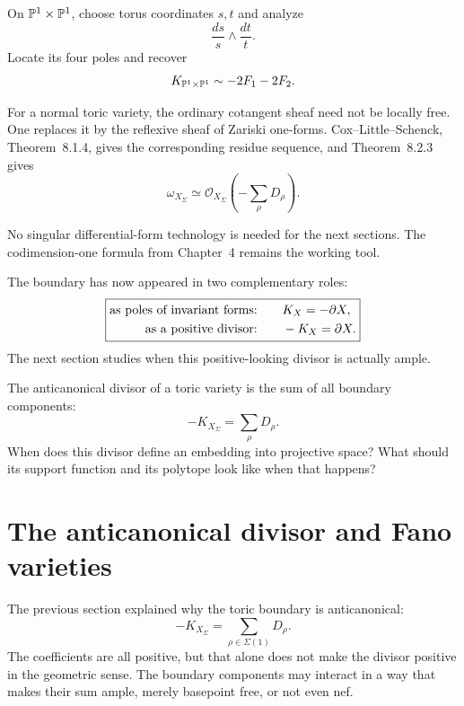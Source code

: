 \begin{pauseandthink}
On \(\mathbb{P}^1\times\mathbb{P}^1\), choose torus coordinates \(s,t\) and analyze
\[
\frac{ds}{s}\wedge\frac{dt}{t}.
\]
Locate its four poles and recover
\[
K_{\mathbb{P}^1\times\mathbb{P}^1}
\sim
-2F_1-2F_2.
\]
\end{pauseandthink}

\begin{observation}
For a normal toric variety, the ordinary cotangent sheaf need not be
locally free. One replaces it by the reflexive sheaf of Zariski
one-forms. Cox--Little--Schenck, Theorem~8.1.4, gives the corresponding
residue sequence, and Theorem~8.2.3 gives
\[
\omega_{X_\Sigma}
\simeq
\mathcal O_{X_\Sigma}\!\left(-\sum_\rho D_\rho\right).
\]

No singular differential-form technology is needed for the next
sections. The codimension-one formula from Chapter~4 remains the
working tool.
\end{observation}

The boundary has now appeared in two complementary roles:
\[
\boxed{
\begin{aligned}
\text{as poles of invariant forms:}
&\qquad K_X=-\partial X,\\
\text{as a positive divisor:}
&\qquad -K_X=\partial X.
\end{aligned}
}
\]
The next section studies when this positive-looking divisor is
actually ample.

\begin{guidingquestion}
The anticanonical divisor of a toric variety is the sum of all boundary
components:
\[
-K_{X_\Sigma}=\sum_\rho D_\rho.
\]
When does this divisor define an embedding into projective space?
What should its support function and its polytope look like when that
happens?
\end{guidingquestion}
\section{The anticanonical divisor and Fano varieties}
\label{sec:anticanonical-fano}

The previous section explained why the toric boundary is anticanonical:
\[
-K_{X_\Sigma}=\sum_{\rho\in\Sigma(1)}D_\rho.
\]
The coefficients are all positive, but that alone does not make the
divisor positive in the geometric sense. The boundary components may
interact in a way that makes their sum ample, merely basepoint free, or
not even nef.

